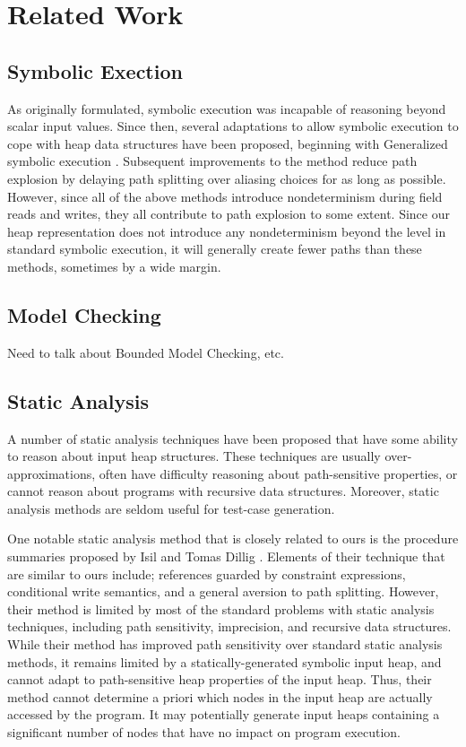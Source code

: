 \section{Related Work}
\label{related}

\subsection{Symbolic Exection}
As originally formulated, symbolic execution was incapable of reasoning beyond scalar input values. Since then, several adaptations to allow symbolic execution to cope with heap data structures have been proposed, beginning with Generalized symbolic execution \cite{GSE03}. Subsequent improvements to the method \cite{Deng:2006,Deng:2007} reduce path explosion by delaying path splitting over aliasing choices for as long as possible. However, since all of the above methods introduce nondeterminism during field reads and writes, they all contribute to path explosion to some extent. Since our heap representation does not introduce any nondeterminism beyond the level in standard symbolic execution, it will generally create fewer paths than these methods, sometimes by a wide margin.

\subsection{Model Checking}
Need to talk about Bounded Model Checking, etc.

\subsection{Static Analysis}
A number of static analysis techniques have been proposed that have some ability to reason about input heap structures. These techniques are usually over-approximations, often have difficulty reasoning about path-sensitive properties, or cannot reason about programs with recursive data structures. Moreover, static analysis methods are seldom useful for test-case generation.

One notable static analysis method that is closely related to ours is the procedure summaries proposed by Isil and Tomas Dillig \cite{Dillig:2011}. Elements of their technique that are similar to ours include; references guarded by constraint expressions, conditional write semantics, and a general aversion to path splitting. However, their method is limited by most of the standard problems with static analysis techniques, including path sensitivity, imprecision, and recursive data structures. While their method has improved path sensitivity over standard static analysis methods, it remains limited by a statically-generated symbolic input heap, and cannot adapt to path-sensitive heap properties of the input heap. Thus, their method cannot determine a priori which nodes in the input heap are actually accessed by the program. It may potentially generate input heaps containing a significant number of nodes that have no impact on program execution.

